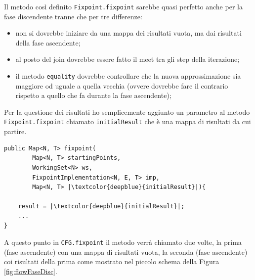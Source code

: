 Il metodo così definito \texttt{Fixpoint.fixpoint} sarebbe quasi perfetto anche per la fase discendente tranne che per tre differenze:
\begin{itemize}
\itemsep0pt
    \item non si dovrebbe iniziare da una mappa dei risultati vuota, ma dai risultati della fase ascendente;
    \item al posto del join dovrebbe essere fatto il meet tra gli step della iterazione;
    \item il metodo \texttt{equality} dovrebbe controllare che la nuova approssimazione sia maggiore od uguale a quella vecchia (ovvere dovrebbe fare il contrario rispetto a quello che fa durante la fase ascendente);
\end{itemize}
Per la questione dei risultati ho semplicemente aggiunto un parametro al metodo \texttt{Fixpoint.fixpoint} chiamato \texttt{initialResult} che è una mappa di risultati da cui partire. 
\begin{lstlisting}[belowskip=-1.1 \baselineskip, escapechar=|]
public Map<N, T> fixpoint(
        Map<N, T> startingPoints, 
        WorkingSet<N> ws,
        FixpointImplementation<N, E, T> imp, 
        Map<N, T> |\textcolor{deepblue}{initialResult}|){

    result = |\textcolor{deepblue}{initialResult}|;
    ...
}
\end{lstlisting}
A questo punto in \texttt{CFG.fixpoint} il metodo verrà chiamato due volte, la prima (fase ascendente) con una mappa di risultati vuota, la seconda (fase ascendente) coi risultati della prima come mostrato nel piccolo schema della Figura \ref{fig:flowFaseDisc}.

